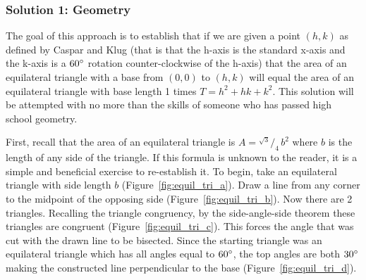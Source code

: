 \documentclass[12pt,letter]{article}
\newcommand*\rfrac[2]{{}^{#1}\!/_{#2}}
\begin{document}
\subsubsection{Solution 1: Geometry}
The goal of this approach is to establish that if we are given a point $(h,k)$ as defined by Caspar and Klug (that is that the h-axis is the standard x-axis and the k-axis is a $60\degree$ rotation counter-clockwise of the h-axis) that the area of an equilateral triangle with a base from $(0,0)$ to $(h,k)$ will equal the area of an equilateral triangle with base length 1 times $T = h^2 + hk + k^2$. This solution will be attempted with no more than the skills of someone who has passed high school geometry.

First, recall that the area of an equilateral triangle is $A = \rfrac {\sqrt{3}} {4} \, b^2$ where $b$ is the length of any side of the triangle. If this formula is unknown to the reader, it is a simple and beneficial exercise to re-establish it. To begin, take an equilateral triangle with side length $b$ (Figure~\ref{fig:equil_tri_a}). Draw a line from any corner to the midpoint of the opposing side (Figure~\ref{fig:equil_tri_b}). Now there are 2 triangles. Recalling the triangle congruency, by the side-angle-side theorem these triangles are congruent (Figure~\ref{fig:equil_tri_c}). This forces the angle that was cut with the drawn line to be bisected. Since the starting triangle was an equilateral triangle which has all angles equal to $60\degree$, the top angles are both $30\degree$ making the constructed line perpendicular to the base (Figure~\ref{fig:equil_tri_d}).
\end{document}
